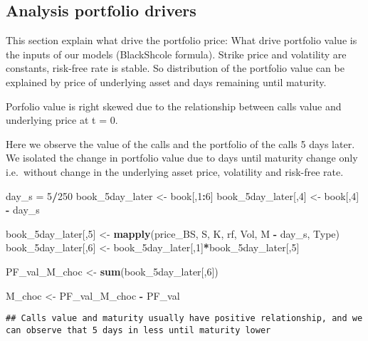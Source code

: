 \documentclass[]{article}
\newenvironment{Shaded}{\begin{snugshade}}{\end{snugshade}}
\newcommand{\DecValTok}[1]{\textcolor[rgb]{0.00,0.00,0.81}{#1}}
\newcommand{\KeywordTok}[1]{\textcolor[rgb]{0.13,0.29,0.53}{\textbf{#1}}}
\newcommand{\NormalTok}[1]{#1}
\newcommand{\OperatorTok}[1]{\textcolor[rgb]{0.81,0.36,0.00}{\textbf{#1}}}
\newcommand{\StringTok}[1]{\textcolor[rgb]{0.31,0.60,0.02}{#1}}
\begin{document}
\hypertarget{analysis-portfolio-drivers}{%
\subsection{Analysis portfolio
drivers}\label{analysis-portfolio-drivers}}

This section explain what drive the portfolio price: What drive
portfolio value is the inputs of our models (BlackShcole formula).
Strike price and volatility are constants, risk-free rate is stable. So
distribution of the portfolio value can be explained by price of
underlying asset and days remaining until maturity.

Porfolio value is right skewed due to the relationship between calls
value and underlying price at t = 0.

Here we observe the value of the calls and the portfolio of the calls 5
days later. We isolated the change in portfolio value due to days until
maturity change only i.e.~without change in the underlying asset price,
volatility and risk-free rate.

\begin{Shaded}
\begin{Highlighting}[]
\NormalTok{day\_s =}\StringTok{ }\DecValTok{5}\OperatorTok{/}\DecValTok{250}
\NormalTok{book\_5day\_later      <{-}}\StringTok{ }\NormalTok{book[,}\DecValTok{1}\OperatorTok{:}\DecValTok{6}\NormalTok{]}
\NormalTok{book\_5day\_later[,}\DecValTok{4}\NormalTok{]  <{-}}\StringTok{ }\NormalTok{book[,}\DecValTok{4}\NormalTok{] }\OperatorTok{{-}}\StringTok{ }\NormalTok{day\_s}

\NormalTok{book\_5day\_later[,}\DecValTok{5}\NormalTok{] <{-}}\StringTok{ }\KeywordTok{mapply}\NormalTok{(price\_BS, S, K, rf, Vol, M }\OperatorTok{{-}}\StringTok{ }\NormalTok{day\_s, Type)}
\NormalTok{book\_5day\_later[,}\DecValTok{6}\NormalTok{] <{-}}\StringTok{ }\NormalTok{book\_5day\_later[,}\DecValTok{1}\NormalTok{]}\OperatorTok{*}\NormalTok{book\_5day\_later[,}\DecValTok{5}\NormalTok{]}

\NormalTok{PF\_val\_M\_choc <{-}}\StringTok{ }\KeywordTok{sum}\NormalTok{(book\_5day\_later[,}\DecValTok{6}\NormalTok{])}

\NormalTok{M\_choc <{-}}\StringTok{ }\NormalTok{PF\_val\_M\_choc }\OperatorTok{{-}}\StringTok{ }\NormalTok{PF\_val}
\end{Highlighting}
\end{Shaded}

\begin{verbatim}
## Calls value and maturity usually have positive relationship, and we can observe that 5 days in less until maturity lower
\end{verbatim}
\end{document}
